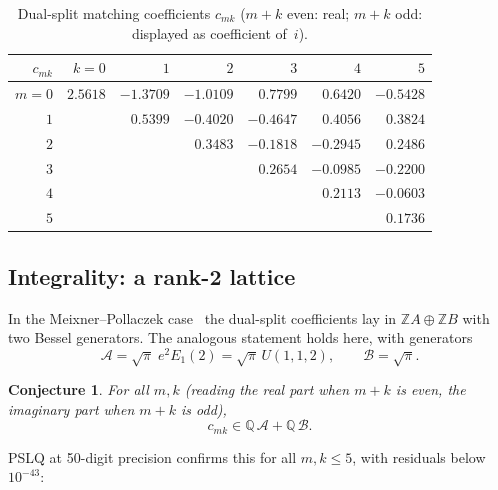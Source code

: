 \documentclass[11pt,a4paper]{article}
\newtheorem{conjecture}[proposition]{Conjecture}
\newcommand{\Z}{\mathbb{Z}}
\newcommand{\Q}{\mathbb{Q}}
\begin{document}
\begin{table}[ht]
\centering
\small
\caption{Dual-split matching coefficients $c_{mk}$
($m+k$ even: real; $m+k$ odd: displayed as coefficient of~$i$).}\label{tab:c}
\begin{tabular}{r|rrrrrr}
$c_{mk}$ & $k=0$ & $1$ & $2$ & $3$ & $4$ & $5$ \\
\hline
$m=0$ & $2.5618$ & $-1.3709$ & $-1.0109$ & $0.7799$ & $0.6420$ & $-0.5428$ \\
$1$ & & $0.5399$ & $-0.4020$ & $-0.4647$ & $0.4056$ & $0.3824$ \\
$2$ & & & $0.3483$ & $-0.1818$ & $-0.2945$ & $0.2486$ \\
$3$ & & & & $0.2654$ & $-0.0985$ & $-0.2200$ \\
$4$ & & & & & $0.2113$ & $-0.0603$ \\
$5$ & & & & & & $0.1736$
\end{tabular}
\end{table}

\subsection{Integrality: a rank-2 lattice}

In the Meixner--Pollaczek case~\cite{MP} the dual-split coefficients
lay in $\Z A \oplus \Z B$ with two Bessel generators. The analogous
statement holds here, with generators
\[
  \mathcal A = \sqrt\pi\; e^2 E_1(2) = \sqrt\pi\, U(1,1,2), \qquad
  \mathcal B = \sqrt\pi .
\]

\begin{conjecture}\label{conj:lattice}
For all $m, k$ (reading the real part when $m+k$ is even, the
imaginary part when $m+k$ is odd),
\[
  c_{mk} \in \Q\,\mathcal A + \Q\,\mathcal B .
\]
\end{conjecture}

PSLQ at 50-digit precision confirms this for all $m, k \le 5$,
with residuals below $10^{-43}$:
\end{document}

